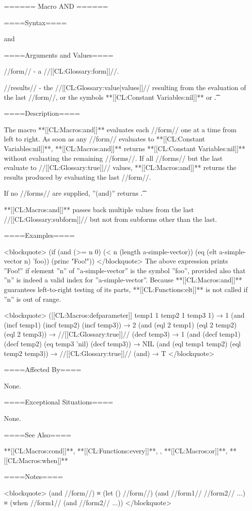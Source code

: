 ====== Macro AND ======

====Syntax====

\DefmacWithValues and {} {}

====Arguments and Values====

//form// - a //[[CL:Glossary:form]]//.

//results// - the //[[CL:Glossary:value|values]]// resulting from the evaluation of the last //form//, or the symbols **[[CL:Constant Variables:nil]]** or \t.

====Description====

The macro **[[CL:Macros:and]]** evaluates each //form// one at a time from left to right. As soon as any //form// evaluates to **[[CL:Constant Variables:nil]]**, **[[CL:Macros:and]]** returns **[[CL:Constant Variables:nil]]** without evaluating the remaining //forms//. If all //forms// but the last evaluate to //[[CL:Glossary:true]]// values, **[[CL:Macros:and]]** returns the results produced by evaluating the last //form//.

If no //forms// are supplied, ''(and)'' returns \t.

**[[CL:Macros:and]]** passes back multiple values from the last //[[CL:Glossary:subform]]// but not from subforms other than the last.

====Examples====

<blockquote> (if (and (>= n 0) (< n (length a-simple-vector)) (eq (elt a-simple-vector n) 'foo)) (princ "Foo!")) </blockquote> The above expression prints ''Foo!'' if element ''n'' of ''a-simple-vector'' is the symbol ''foo'', provided also that ''n'' is indeed a valid index for ''a-simple-vector''. Because **[[CL:Macros:and]]** guarantees left-to-right testing of its parts, **[[CL:Functions:elt]]** is not called if ''n'' is out of range.

<blockquote> ([[CL:Macros:defparameter]] temp1 1 temp2 1 temp3 1) → 1 (and (incf temp1) (incf temp2) (incf temp3)) → 2 (and (eql 2 temp1) (eql 2 temp2) (eql 2 temp3)) → //[[CL:Glossary:true]]// (decf temp3) → 1 (and (decf temp1) (decf temp2) (eq temp3 'nil) (decf temp3)) → NIL (and (eql temp1 temp2) (eql temp2 temp3)) → //[[CL:Glossary:true]]// (and) → T </blockquote>

====Affected By====

None.

====Exceptional Situations====

None.

====See Also====

**[[CL:Macros:cond]]**, **[[CL:Functions:every]]**, , **[[CL:Macros:or]]**, **[[CL:Macros:when]]**

====Notes====

<blockquote> (and //form//) ≡ (let () //form//) (and //form1// //form2// ...) ≡ (when //form1// (and //form2// ...)) </blockquote>


